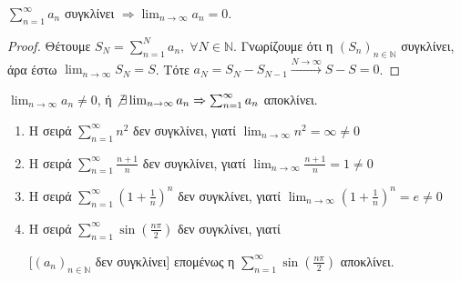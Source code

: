 \documentclass[main.tex]{subfiles}
\begin{document}
\begin{prop}
    $ \sum_{n=1}^{\infty} a_{n} $ συγκλίνει $ \Rightarrow \lim_{n \to \infty} a_{n} 
    = 0 $.
\end{prop}
\begin{proof}
\item {}
    Θέτουμε $ S_{N} = \sum_{n=1}^{N} a_{n}, \; \forall N \in \mathbb{N} $. Γνωρίζουμε 
    ότι η $ {(S_{n})}_{n \in \mathbb{N}} $ συγκλίνει, άρα έστω $ \lim_{n \to \infty} S_{N} = S$.
    Τότε $ a_{N} = S_{N}-S_{N-1} \xrightarrow{N \to \infty} S-S = 0 $.
\end{proof}

\begin{cor}[Αντιθετοαντίστροφο]
    $ \lim_{n \to \infty} a_{n} \neq 0 $, ή $ \not \exists \lim_{n \to \infty} a_{n} 
    \Rightarrow \sum_{n=1}^{\infty} a_{n} $ αποκλίνει.
\end{cor}

\begin{examples}
    \begin{enumerate}
        \item Η σειρά $ \sum_{n=1}^{\infty} n^{2} $ δεν συγκλίνει, γιατί 
            $ \lim_{n \to \infty} n^{2} = \infty \neq 0$
        \item Η σειρά $ \sum_{n=1}^{\infty} \frac{n+1}{n} $ δεν συγκλίνει, γιατί 
            $ \lim_{n \to \infty} \frac{n+1}{n} = 1 \neq 0 $
        \item Η σειρά $ \sum_{n=1}^{\infty} (1 + \frac{1}{n} )^{n} $ δεν συγκλίνει, 
            γιατί $ \lim_{n \to \infty} (1+ \frac{1}{n} )^{n} = e \neq 0 $
        \item Η σειρά $ \sum_{n=1}^{\infty} \sin{\left(\frac{n \pi}{2}\right)} $ 
            δεν συγκλίνει, γιατί 

            \begin{minipage}{0.55\textwidth}
            \end{minipage}

            [$ {(a_{n})}_{n \in \mathbb{N}} $ δεν συγκλίνει]
            επομένως η $ \sum_{n=1}^{\infty} \sin{\left(\frac{n \pi}{2}\right) } $ 
            αποκλίνει.
    \end{enumerate}
\end{examples}
\end{document}
